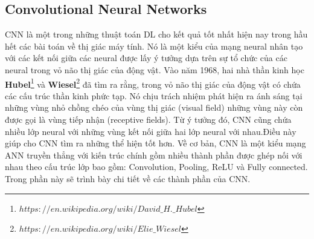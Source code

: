 \subsection{Convolutional Neural Networks}
	CNN là một trong những thuật toán DL cho kết quả tốt nhất hiện nay trong hầu hết các bài toán về thị giác máy tính. Nó là một kiểu của mạng neural nhân tạo với các kết nối giữa các neural được lấy ý tưởng dựa trên sự tổ chức của các neural trong vỏ não thị giác của động vật. Vào năm 1968, hai nhà thần kinh học \textbf{Hubel}\footnote{$https://en.wikipedia.org/wiki/David\_H.\_Hubel$} và \textbf{Wiesel}\footnote{$https://en.wikipedia.org/wiki/Elie\_Wiesel$} đã tìm ra rằng, trong vỏ não thị giác của động vật có chứa các cấu trúc thần kinh phức tạp. Nó chịu trách nhiệm phát hiện ra ánh sáng tại những vùng nhỏ chồng chéo của vùng thị giác (visual field) những vùng này còn được gọi là vùng tiếp nhận (receptive fields). Từ ý tưởng đó, CNN cũng 	chứa nhiều lớp neural với những vùng kết nối giữa hai lớp neural với nhau.Điều này giúp cho CNN tìm ra những thể hiện tốt hơn. Về cơ bản, CNN là một kiểu mạng ANN truyền thẳng với kiến trúc chính gồm nhiều thành phần được ghép nối với nhau theo cấu trúc lớp bao gồm: Convolution, Pooling, ReLU và Fully connected. Trong phần này sẽ trình bày chi tiết về các thành phần của CNN.

